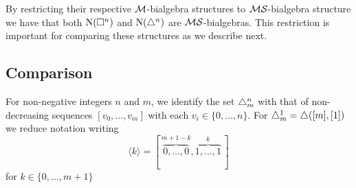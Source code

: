 By restricting their respective $\mathcal{M}$-bialgebra structures to $\mathcal{MS}$-bialgebra structure we have that both $\operatorname{N}(\square^n)$ and $\operatorname{N}(\triangle^n)$ are $\mathcal{MS}$-bialgebras.
This restriction is important for comparing these structures as we describe next.

\subsection{Comparison}


For non-negative integers $n$ and $m$, we identify the set $\triangle^n_m$ with that of non-decreasing sequences $[v_0, \dots, v_m]$ with each $v_i \in \{0, \dots, n\}$.
For $\triangle^1_m = \triangle([m], [1])$ we reduce notation writing
\begin{equation*}
\langle k \rangle = [\, \overbrace{0,\dots,0}^{m+1-k}, \overbrace{1,\dots,1}^{k}\,]
\end{equation*}
for $k \in \{0, \dots, m+1\}$


